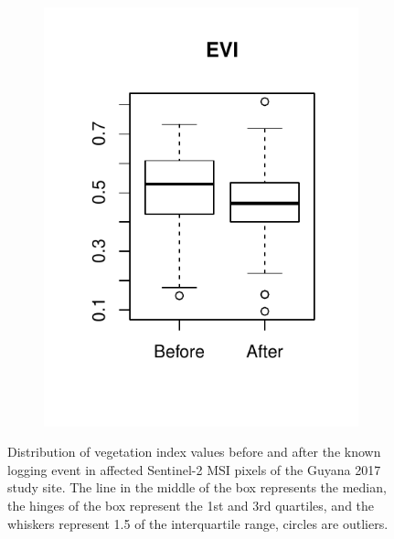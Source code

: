 \documentclass[a4paper,12pt]{scrbook}
\begin{document}
\begin{figure}
\begin{subfigure}[b]{0.32\textwidth}
    \includegraphics[width=\textwidth]{thesis-figures/07-boxplot-evi}
  \end{subfigure}
  \caption{Distribution of vegetation index values before and after the known logging event in affected Sentinel-2 \ac{MSI} pixels of the Guyana 2017 study site. The line in the middle of the box represents the median, the hinges of the box represent the 1st and 3rd quartiles, and the whiskers represent 1.5 of the interquartile range, circles are outliers.}
  \label{fig-boxplots}
\end{figure}
\end{document}
